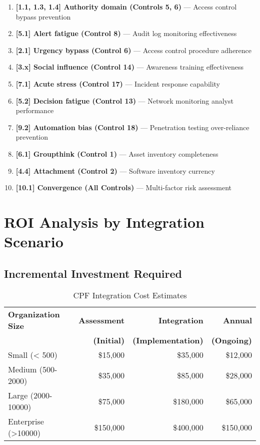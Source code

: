 \documentclass[11pt,a4paper]{article}
\begin{document}
\begin{enumerate}
\item \textbf{[1.1, 1.3, 1.4] Authority domain (Controls 5, 6)} --- Access control bypass prevention

\item \textbf{[5.1] Alert fatigue (Control 8)} --- Audit log monitoring effectiveness

\item \textbf{[2.1] Urgency bypass (Control 6)} --- Access control procedure adherence

\item \textbf{[3.x] Social influence (Control 14)} --- Awareness training effectiveness

\item \textbf{[7.1] Acute stress (Control 17)} --- Incident response capability

\item \textbf{[5.2] Decision fatigue (Control 13)} --- Network monitoring analyst performance

\item \textbf{[9.2] Automation bias (Control 18)} --- Penetration testing over-reliance prevention

\item \textbf{[6.1] Groupthink (Control 1)} --- Asset inventory completeness

\item \textbf{[4.4] Attachment (Control 2)} --- Software inventory currency

\item \textbf{[10.1] Convergence (All Controls)} --- Multi-factor risk assessment
\end{enumerate}

\section{ROI Analysis by Integration Scenario}

\subsection{Incremental Investment Required}

\begin{table}[ht]
\centering
\caption{CPF Integration Cost Estimates}
\begin{tabular}{lrrr}
\toprule
\textbf{Organization Size} & \textbf{Assessment} & \textbf{Integration} & \textbf{Annual} \\
 & \textbf{(Initial)} & \textbf{(Implementation)} & \textbf{(Ongoing)} \\
\midrule
Small (< 500) & \$15,000 & \$35,000 & \$12,000 \\
Medium (500-2000) & \$35,000 & \$85,000 & \$28,000 \\
Large (2000-10000) & \$75,000 & \$180,000 & \$65,000 \\
Enterprise (>10000) & \$150,000 & \$400,000 & \$150,000 \\
\bottomrule
\end{tabular}
\end{table}
\end{document}
